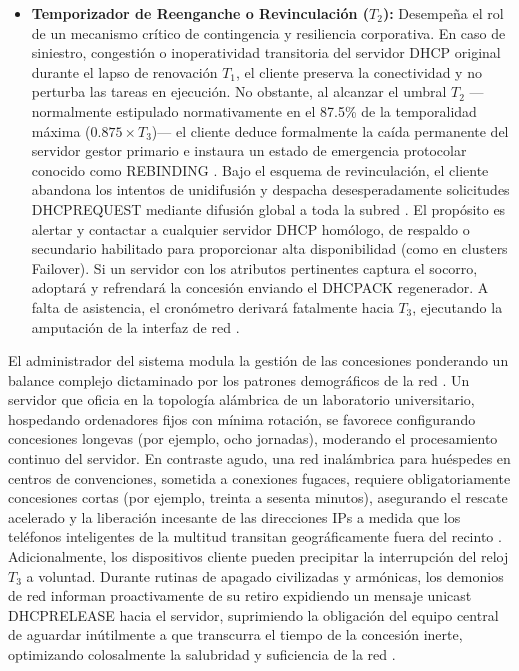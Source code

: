 \documentclass[a4paper,12pt]{article}
\begin{document}
\begin{itemize}
    \item \textbf{Temporizador de Reenganche o Revinculación ($T_2$):} Desempeña el rol de un mecanismo crítico de contingencia y resiliencia corporativa. En caso de siniestro, congestión o inoperatividad transitoria del servidor DHCP original durante el lapso de renovación $T_1$, el cliente preserva la conectividad y no perturba las tareas en ejecución. No obstante, al alcanzar el umbral $T_2$ —normalmente estipulado normativamente en el 87.5\% de la temporalidad máxima ($0.875 \times T_3$)— el cliente deduce formalmente la caída permanente del servidor gestor primario e instaura un estado de emergencia protocolar conocido como REBINDING \cite{serviciosgs_dhcp, juniper_dhcp_lease_times, rfc2131}. Bajo el esquema de revinculación, el cliente abandona los intentos de unidifusión y despacha desesperadamente solicitudes DHCPREQUEST mediante difusión global a toda la subred \cite{serviciosgs_dhcp}. El propósito es alertar y contactar a cualquier servidor DHCP homólogo, de respaldo o secundario habilitado para proporcionar alta disponibilidad (como en clusters Failover). Si un servidor con los atributos pertinentes captura el socorro, adoptará y refrendará la concesión enviando el DHCPACK regenerador. A falta de asistencia, el cronómetro derivará fatalmente hacia $T_3$, ejecutando la amputación de la interfaz de red \cite{serviciosgs_dhcp, rfc2131}.
\end{itemize}

El administrador del sistema modula la gestión de las concesiones ponderando un balance complejo dictaminado por los patrones demográficos de la red \cite{manageengine_dhcp_lease}. Un servidor que oficia en la topología alámbrica de un laboratorio universitario, hospedando ordenadores fijos con mínima rotación, se favorece configurando concesiones longevas (por ejemplo, ocho jornadas), moderando el procesamiento continuo del servidor. En contraste agudo, una red inalámbrica para huéspedes en centros de convenciones, sometida a conexiones fugaces, requiere obligatoriamente concesiones cortas (por ejemplo, treinta a sesenta minutos), asegurando el rescate acelerado y la liberación incesante de las direcciones IPs a medida que los teléfonos inteligentes de la multitud transitan geográficamente fuera del recinto \cite{redeszone_dhcp_lease, godaddy_dhcp}. Adicionalmente, los dispositivos cliente pueden precipitar la interrupción del reloj $T_3$ a voluntad. Durante rutinas de apagado civilizadas y armónicas, los demonios de red informan proactivamente de su retiro expidiendo un mensaje unicast DHCPRELEASE hacia el servidor, suprimiendo la obligación del equipo central de aguardar inútilmente a que transcurra el tiempo de la concesión inerte, optimizando colosalmente la salubridad y suficiencia de la red \cite{rfc2131, serviciosgs_dhcp}.
\end{document}
